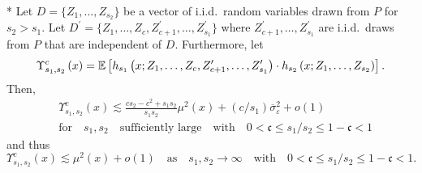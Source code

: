 \begin{boxD}
    \begin{lem}\label{lem:upsilon_sc}\mbox{}\\*
	Let $D = \{Z_1, \dotsc, Z_{s_2}\}$ be a vector of i.i.d.\ random variables drawn from $P$ for $s_2 > s_1$.
	Let $D^{\prime} = \{Z_1, \dotsc, Z_{c}, Z_{c+1}^{\prime}, \dotsc,  Z_{s_1}^{\prime}\}$ where $Z_{c+1}^{\prime}, \dotsc,  Z_{s_1}^{\prime}$ are i.i.d.\ draws from $P$ that are independent of $D$.
	Furthermore, let
	\begin{equation}
		\Upsilon_{s_1, s_2}^{c}\left(x\right)
		= \mathbb{E}\left[h_{s_1}\left(x; Z_1, \ldots, Z_c, Z^{\prime}_{c+1}, \ldots,  Z^{\prime}_{s_1}\right) \cdot
			h_{s_2}\left(x; Z_1, \ldots, Z_{s_2}\right)\right].
	\end{equation}
	Then,
	\begin{equation}
		\begin{aligned}
			 & \Upsilon_{s_1, s_2}^{c}\left(x\right)
			\lesssim \frac{c s_2 - c^2 + s_1 s_2}{s_1 s_2}\mu^2(x) + (c/s_1) \overline{\sigma}^2_{\varepsilon} + o(1) \\
			 & \text{for} \quad s_1, s_2 \quad \text{sufficiently large}
			\quad \text{with} \quad
			0 < \mathfrak{c} \leq s_1 / s_2 \leq 1 - \mathfrak{c} < 1
		\end{aligned}
	\end{equation}
	and thus
	\begin{equation}
		\Upsilon_{s_1, s_2}^{c}\left(x\right)
		\lesssim \mu^2(x) + o(1)
		\quad \text{as} \quad s_1, s_2 \rightarrow \infty
		\quad \text{with} \quad
		0 < \mathfrak{c} \leq s_1 / s_2 \leq 1 - \mathfrak{c} < 1.
	\end{equation}
\end{lem}
\end{boxD}

